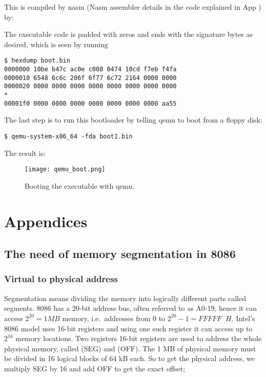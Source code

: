 \documentclass[a4paper]{article}
\begin{document}


This is compiled by nasm (Nasm assembler details in the code explained in App \TODO) by:
The executable code is padded with zeros and ends with the signature bytes as desired, which is seen by running 
\begin{verbatim}
$ hexdump boot.bin
0000000 10be b47c ac0e c008 0474 10cd f7eb f4fa
0000010 6548 6c6c 206f 6f77 6c72 2164 0000 0000
0000020 0000 0000 0000 0000 0000 0000 0000 0000
*
00001f0 0000 0000 0000 0000 0000 0000 0000 aa55
\end{verbatim}
The last step is to run this bootloader by telling qemu to boot from a floppy disk:
\begin{verbatim}
$ qemu-system-x86_64 -fda boot1.bin	
\end{verbatim}
The result is:
\begin{figure}[H]
	\centering
	\texttt{[image: qemu\_boot.png]}
	\caption{Booting the executable with qemu.}
\end{figure}

\newpage
\appendix

\section{Appendices}

\newpage
\subsection{The need of memory segmentation in 8086}

\subsubsection{Virtual to physical address}
Segmentation means dividing the memory into logically different parts called segments. 8086 has a 20-bit address bus, often referred to as A0-19, hence it can access $2^{20}=1 MB$ memory, i.e.\ addresses from 0 to $2^{20}-1 = FFFFF \;\; H$. Intel's 8086 model uses 16-bit registers and using one such register it can access up to $2^{16}$ memory locations. Two registers 16-bit registers are used to address the whole physical memory, called  (SEG) and  (OFF). The 1 MB of physical memory must be divided in 16 logical blocks of 64 kB each. So to get the physical address, we multiply SEG by 16 and add OFF to get the exact offset;
\end{document}
